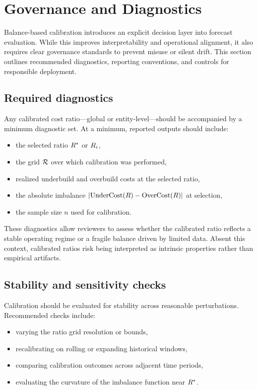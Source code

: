 \section{Governance and Diagnostics}
\label{sec:governance}

Balance-based calibration introduces an explicit decision layer into forecast
evaluation.
While this improves interpretability and operational alignment, it also requires
clear governance standards to prevent misuse or silent drift.
This section outlines recommended diagnostics, reporting conventions, and
controls for responsible deployment.

\subsection{Required diagnostics}
\label{subsec:required_diagnostics}

Any calibrated cost ratio—global or entity-level—should be accompanied by a
minimum diagnostic set.
At a minimum, reported outputs should include:
\begin{itemize}[leftmargin=*]
    \item the selected ratio $R^{\ast}$ or $R_{i}$,
    \item the grid $\mathcal{R}$ over which calibration was performed,
    \item realized underbuild and overbuild costs at the selected ratio,
    \item the absolute imbalance
    $|\mathrm{UnderCost}(R) - \mathrm{OverCost}(R)|$ at selection,
    \item the sample size $n$ used for calibration.
\end{itemize}

These diagnostics allow reviewers to assess whether the calibrated ratio reflects
a stable operating regime or a fragile balance driven by limited data.
Absent this context, calibrated ratios risk being interpreted as intrinsic
properties rather than empirical artifacts.

\subsection{Stability and sensitivity checks}
\label{subsec:stability_checks}

Calibration should be evaluated for stability across reasonable perturbations.
Recommended checks include:
\begin{itemize}[leftmargin=*]
    \item varying the ratio grid resolution or bounds,
    \item recalibrating on rolling or expanding historical windows,
    \item comparing calibration outcomes across adjacent time periods,
    \item evaluating the curvature of the imbalance function near $R^{\ast}$.
\end{itemize}

